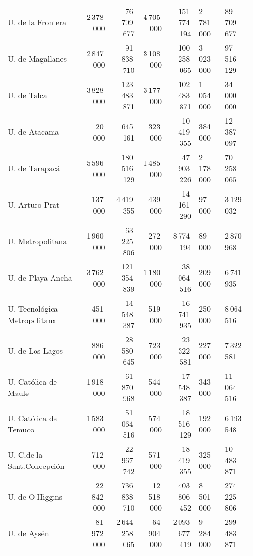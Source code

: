 \begin{tabular}{l rr rr}
U. de la Frontera              &   2\,378\,000 &    76\,709\,677 &   4\,705\,000 &   151\,774\,194 &   2\,781\,000 &    89\,709\,677 \\
U. de Magallanes               &   2\,847\,000 &    91\,838\,710 &   3\,108\,000 &   100\,258\,065 &   3\,023\,000 &    97\,516\,129 \\
U. de Talca                    &   3\,828\,000 &   123\,483\,871 &   3\,177\,000 &   102\,483\,871 &   1\,054\,000 &    34\,000\,000 \\
U. de Atacama                  &      20\,000 &       645\,161 &     323\,000 &    10\,419\,355 &     384\,000 &    12\,387\,097 \\
U. de Tarapacá                 &   5\,596\,000 &   180\,516\,129 &   1\,485\,000 &    47\,903\,226 &   2\,178\,000 &    70\,258\,065 \\
U. Arturo Prat                 &     137\,000 &     4\,419\,355 &     439\,000 &    14\,161\,290 &      97\,000 &     3\,129\,032 \\
U. Metropolitana               &   1\,960\,000 &    63\,225\,806 &     272\,000 &     8\,774\,194 &      89\,000 &     2\,870\,968 \\
U. de Playa Ancha              &   3\,762\,000 &   121\,354\,839 &   1\,180\,000 &    38\,064\,516 &     209\,000 &     6\,741\,935 \\
U. Tecnológica Metropolitana   &     451\,000 &    14\,548\,387 &     519\,000 &    16\,741\,935 &     250\,000 &     8\,064\,516 \\
U. de Los Lagos                &     886\,000 &    28\,580\,645 &     723\,000 &    23\,322\,581 &     227\,000 &     7\,322\,581 \\
U. Católica de Maule           &   1\,918\,000 &    61\,870\,968 &     544\,000 &    17\,548\,387 &     343\,000 &    11\,064\,516 \\
U. Católica de Temuco          &   1\,583\,000 &    51\,064\,516 &     574\,000 &    18\,516\,129 &     192\,000 &     6\,193\,548 \\
U. C.de la Sant.Concepción     &     712\,000 &    22\,967\,742 &     571\,000 &    18\,419\,355 &     325\,000 &    10\,483\,871 \\
U. de O'Higgins                &  22\,842\,000 &   736\,838\,710 &  12\,518\,000 &   403\,806\,452 &   8\,501\,000 &   274\,225\,806 \\
U. de Aysén                    &  81\,972\,000 & 2\,644\,258\,065 &  64\,904\,000 & 2\,093\,677\,419 &   9\,284\,000 &   299\,483\,871 \\
\hline\end{tabular}
